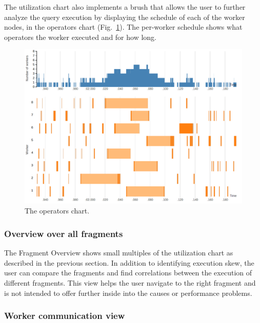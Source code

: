 \documentclass{chi2009}
\newcommand*{\overall}{Fragment Overview\xspace}
\begin{document}
The utilization chart also implements a brush that allows the user to further
analyze the query execution by displaying the schedule of each of the worker
nodes, in the operators chart (Fig.~\ref{fig:operators_chart}). The per-worker
schedule shows what operators the worker executed and for how long.


\begin{figure}[ht]
  \includegraphics[width=\columnwidth]{images/operators_chart}
  \caption{The operators chart.}
  \label{fig:operators_chart}
\end{figure}


\subsubsection{Overview over all fragments}
\label{sec:fragments}


The \overall shows small multiples of the utilization chart as described in the previous section.
In addition to identifying execution skew, the user can compare the fragments and find
correlations between the execution of different fragments. This view helps the user navigate to the
right fragment and is not intended to offer further inside into the causes or performance problems.


\subsubsection{Worker communication view}
\end{document}
